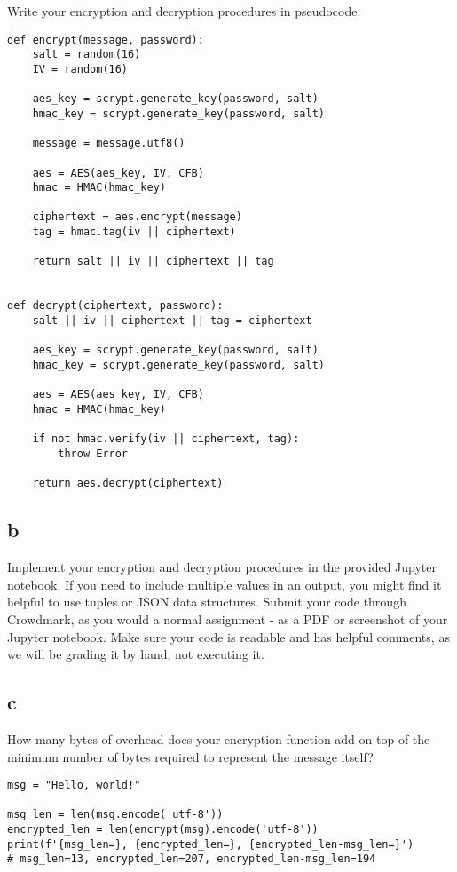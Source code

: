 \documentclass[11pt]{article}
\begin{document}
Write your encryption and decryption procedures in pseudocode.

\begin{verbatim}
def encrypt(message, password):
    salt = random(16)
    IV = random(16)

    aes_key = scrypt.generate_key(password, salt)
    hmac_key = scrypt.generate_key(password, salt)

    message = message.utf8()

    aes = AES(aes_key, IV, CFB)
    hmac = HMAC(hmac_key)

    ciphertext = aes.encrypt(message)
    tag = hmac.tag(iv || ciphertext)

    return salt || iv || ciphertext || tag


def decrypt(ciphertext, password):
    salt || iv || ciphertext || tag = ciphertext

    aes_key = scrypt.generate_key(password, salt)
    hmac_key = scrypt.generate_key(password, salt)

    aes = AES(aes_key, IV, CFB)
    hmac = HMAC(hmac_key)

    if not hmac.verify(iv || ciphertext, tag):
        throw Error

    return aes.decrypt(ciphertext)
\end{verbatim}

\subsection{b}

Implement your encryption and decryption procedures in the provided Jupyter notebook. If you need to include multiple values in an output, you might find it helpful to use tuples or JSON data structures.
Submit your code through Crowdmark, as you would a normal assignment - as a PDF or
screenshot of your Jupyter notebook. Make sure your code is readable and has helpful comments, as we will be grading it by hand, not executing it.

\subsection{c}

How many bytes of overhead does your encryption function add on top of the minimum number of bytes required to represent the message itself?


\begin{verbatim}
msg = "Hello, world!"

msg_len = len(msg.encode('utf-8'))
encrypted_len = len(encrypt(msg).encode('utf-8'))
print(f'{msg_len=}, {encrypted_len=}, {encrypted_len-msg_len=}')
# msg_len=13, encrypted_len=207, encrypted_len-msg_len=194
\end{verbatim}
\end{document}
